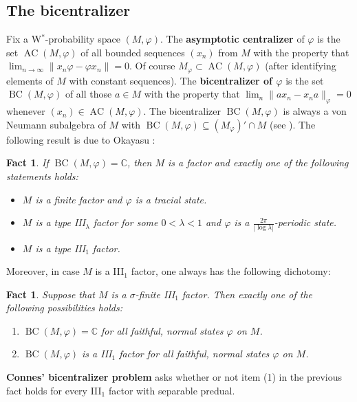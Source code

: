 \documentclass[12pt]{amsart}
\newtheorem{fact}[thm]{Fact}
\theoremstyle{definition}
\newcommand{\C}{\mathbb{C}}
\def\bb{\mathbb}
\def\bb{\mathbb}
\def\BC{\operatorname{BC}}
\begin{document}
\subsection{The bicentralizer}\label{BCsection}

Fix a W$^*$-probability space $(M,\varphi)$.  The \textbf{asymptotic centralizer} of $\varphi$ is the set $\operatorname{AC}(M,\varphi)$ of all bounded sequences $(x_n)$ from $M$ with the property that $\lim_{n\to \infty}\|x_n\varphi-\varphi x_n\|=0$.  Of course $M_\varphi\subset \operatorname{AC}(M,\varphi)$ (after identifying elements of $M$ with constant sequences).  The \textbf{bicentralizer of $\varphi$} is the set $\BC(M,\varphi)$ of all those $a\in M$ with the property that $\lim_n \|ax_n-x_na\|_\varphi=0$ whenever $(x_n)\in \operatorname{AC}(M,\varphi)$.  The bicentralizer $\BC(M,\varphi)$ is always a von Neumann subalgebra of $M$ with $\BC(M,\varphi)\subseteq (M_\varphi)'\cap M$ (see \cite[Proposition 1.3(1)]{haagerup87}). The following result is due to Okayasu \cite{okayasu24}: 
\begin{fact}\label{bc for generalfactors}
If $\BC(M,\varphi)=\C$, then $M$ is a factor and exactly one of the following statements holds:
\begin{itemize}
\item[(1)] $M$ is a finite factor and $\varphi$ is a tracial state. \item[(2)] $M$ is a type III$_{\lambda}$ factor for some $0<\lambda<1$ and $\varphi$ is a $\frac{2\pi}{|\log \lambda|}$-periodic state. 
\item[(3)] $M$ is a type III$_1$ factor.
\end{itemize} 
\end{fact}
Moreover, in case $M$ is a III$_1$ factor, one always has the following dichotomy:

\begin{fact}\label{bicentralizerdichotomy}
Suppose that $M$ is a $\sigma$-finite III$_1$ factor.  Then exactly one of the following possibilities holds:
\begin{enumerate}
    \item $\BC(M,\varphi)=\bb C$ for all faithful, normal states $\varphi$ on $M$.
    \item $\BC(M,\varphi)$ is a III$_1$ factor for all faithful, normal states $\varphi$ on $M$.
\end{enumerate}
\end{fact}

\textbf{Connes' bicentralizer problem} asks whether or not item (1) in the previous fact holds for every III$_1$ factor with separable predual.
\end{document}
